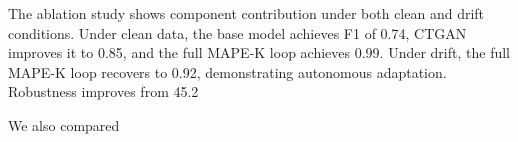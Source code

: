 The ablation study shows component contribution under both clean and drift conditions. Under clean data, the base model achieves F1 of 0.74, CTGAN improves it to 0.85, and the full MAPE-K loop achieves 0.99. Under drift, the full MAPE-K loop recovers to 0.92, demonstrating autonomous adaptation. Robustness improves from 45.2%

We also compared